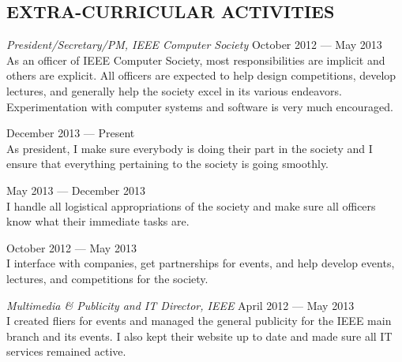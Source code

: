 \documentclass[margin]{res}
\begin{document}
\begin{resume}
  \section{EXTRA-CURRICULAR ACTIVITIES}             
  {\sl President/Secretary/PM, IEEE Computer Society}
  \hfill October 2012 --- May 2013 \\
  As an officer of IEEE Computer Society, most responsibilities are
  implicit and others are explicit. All officers are expected to
  help design competitions, develop lectures, and generally help the
  society excel in its various endeavors. Experimentation with
  computer systems and software is very much encouraged.
  \begin{description}[leftmargin=1.5em] 
  \item [President] \hfill December 2013 --- Present \\
    As president, I make sure everybody is doing their part in the
    society and I ensure that everything pertaining to the society is
    going smoothly.
  \item [Secretary] \hfill May 2013 --- December 2013 \\
    I handle all logistical appropriations of the society and make
    sure all officers know what their immediate tasks are.
  \item [Project Manager] \hfill October 2012 --- May 2013 \\
    I interface with companies, get partnerships for events, and
    help develop events, lectures, and competitions for the
    society.
  \end{description}     
  {\sl Multimedia \& Publicity and IT Director, IEEE}
  \hfill April 2012 --- May 2013 \\
  I created fliers for events and managed the general publicity for
  the IEEE main branch and its events. I also kept their website up to
  date and made sure all IT services remained active.
\end{resume}
\end{document}
